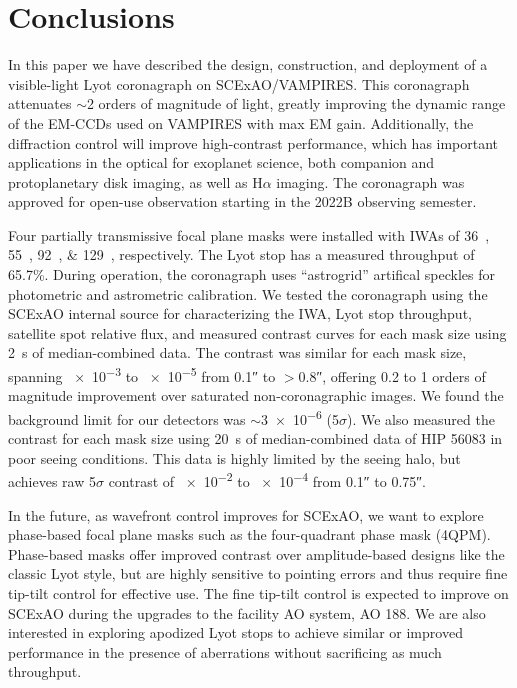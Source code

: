 \documentclass[]{spie}  %
\begin{document}
\section{Conclusions}\label{sec:conclusions}

In this paper we have described the design, construction, and deployment of a visible-light Lyot coronagraph on SCExAO/VAMPIRES. This coronagraph attenuates $\sim$2 orders of magnitude of light, greatly improving the dynamic range of the EM-CCDs used on VAMPIRES with max EM gain. Additionally, the diffraction control will improve high-contrast performance, which has important applications in the optical for exoplanet science, both companion and protoplanetary disk imaging, as well as H$\alpha$ imaging. The coronagraph was approved for open-use observation starting in the 2022B observing semester.

Four partially transmissive focal plane masks were installed with IWAs of \qtylist{36;55;92;129}{\milliarcsecond}, respectively. The Lyot stop has a measured throughput of 65.7\%. During operation, the coronagraph uses ``astrogrid'' artifical speckles for photometric and astrometric calibration. We tested the coronagraph using the SCExAO internal source for characterizing the IWA, Lyot stop throughput, satellite spot relative flux, and measured contrast curves for each mask size using \qty{2}{\second} of median-combined data. The contrast was similar for each mask size, spanning \num{e-3} to \num{e-5} from \ang{;;0.1} to $>$\ang{;;0.8}, offering 0.2 to 1 orders of magnitude improvement over saturated non-coronagraphic images. We found the background limit for our detectors was $\sim$\num{3e-6} (5$\sigma$). We also measured the contrast for each mask size using \qty{20}{\second} of median-combined data of HIP 56083 in poor seeing conditions. This data is highly limited by the seeing halo, but achieves raw 5$\sigma$ contrast of \num{e-2} to \num{e-4} from \ang{;;0.1} to \ang{;;0.75}.

In the future, as wavefront control improves for SCExAO, we want to explore phase-based focal plane masks such as the four-quadrant phase mask (4QPM)\cite{rouanFourQuadrantPhase2007}. Phase-based masks offer improved contrast over amplitude-based designs like the classic Lyot style, but are highly sensitive to pointing errors and thus require fine tip-tilt control for effective use\cite{huby2017}. The fine tip-tilt control is expected to improve on SCExAO during the upgrades to the facility AO system, AO 188. We are also interested in exploring apodized Lyot stops to achieve similar or improved performance in the presence of aberrations without sacrificing as much throughput.
\end{document}
